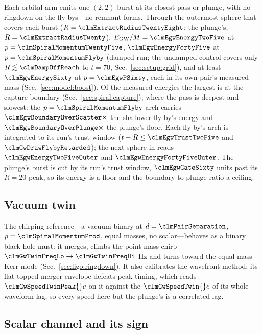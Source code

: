 \documentclass[twocolumn,floatfix,aps,prd,superscriptaddress,nofootinbib]{revtex4-2}
\begin{document}
Each orbital arm emits one $(2,2)$ burst at its closest pass or plunge, with no ringdown on the fly-bys---no remnant forms. Through the outermost sphere that covers each burst ($R=\clmExtractRadiusTwentyEight$; the plunge's, $R=\clmExtractRadiusTwenty$), $E_{\rm GW}/M=\clmEgwEnergyTwoFive$ at $p=\clmSpiralMomentumTwentyFive$, $\clmEgwEnergyFortyFive$ at $p=\clmSpiralMomentumFlyby$ (damped run; the undamped control covers only $R\lesssim\clmDampOffReach$ to $t=70$, Sec.~\ref{sec:setup:grid}), and at least $\clmEgwEnergySixty$ at $p=\clmEgwPSixty$, each in its own pair's measured mass (Sec.~\ref{sec:model:boost}). Of the measured energies the largest is at the capture boundary (Sec.~\ref{sec:spiral:capture}), where the pass is deepest and slowest: the $p=\clmSpiralMomentumFlyby$ arch carries $\clmEgwBoundaryOverScatter\times$ the shallower fly-by's energy and $\clmEgwBoundaryOverPlunge\times$ the plunge's floor. Each fly-by's arch is integrated to its run's trust window ($t-R\le\clmEgwTrustTwoFive$ and $\clmGwDrawFlybyRetarded$); the next sphere in reads $\clmEgwEnergyTwoFiveOuter$ and $\clmEgwEnergyFortyFiveOuter$. The plunge's burst is cut by its run's trust window, $\clmEgwGateSixty$ units past its $R=20$ peak, so its energy is a floor and the boundary-to-plunge ratio a ceiling.

\subsection{Vacuum twin}
\label{sec:controls:bbh}

The chirping reference---a vacuum binary at $d=\clmPairSeparation$, $p=\clmSpiralMomentumProd$, equal masses, no scalar---behaves as a binary black hole must: it merges, climbs the point-mass chirp $\clmGwTwinFreqLo\to\clmGwTwinFreqHi$ Hz and turns toward the equal-mass Kerr mode (Sec.~\ref{sec:ligo:ringdown}). It also calibrates the wavefront method: its flat-topped merger envelope defeats peak timing, which reads $\clmGwSpeedTwinPeak{}c$ on it against the $\clmGwSpeedTwin{}c$ of its whole-waveform lag, so every speed here but the plunge's is a correlated lag.

\subsection{Scalar channel and its sign}
\label{sec:gw:scalar}
\end{document}
